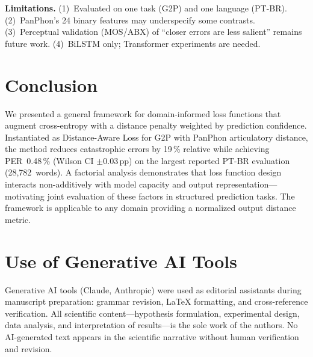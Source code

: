 \documentclass[conference]{IEEEtran}
\begin{document}
\textbf{Limitations.}
(1)~Evaluated on one task (G2P) and one language (PT-BR).
(2)~PanPhon's 24 binary features may underspecify some contrasts.
(3)~Perceptual validation (MOS/ABX) of ``closer errors are less
salient'' remains future work.
(4)~BiLSTM only; Transformer experiments are needed.

\section{Conclusion}

We presented a general framework for domain-informed loss functions
that augment cross-entropy with a distance penalty weighted by
prediction confidence.
Instantiated as Distance-Aware Loss for G2P with PanPhon
articulatory distance, the method reduces catastrophic errors by
19\,\% relative while achieving PER~0.48\,\% (Wilson CI
$\pm$0.03\,pp) on the largest reported PT-BR evaluation
(28{,}782~words).
A factorial analysis demonstrates that loss function design
interacts non-additively with model capacity and output
representation---motivating joint evaluation of these factors
in structured prediction tasks.
The framework is applicable to any domain providing a normalized
output distance metric.

\section*{Use of Generative AI Tools}

Generative AI tools (Claude, Anthropic) were used as editorial
assistants during manuscript preparation: grammar revision,
\LaTeX{} formatting, and cross-reference verification.
All scientific content---hypothesis formulation, experimental
design, data analysis, and interpretation of results---is the
sole work of the authors.
No AI-generated text appears in the scientific narrative without
human verification and revision.



\end{document}
